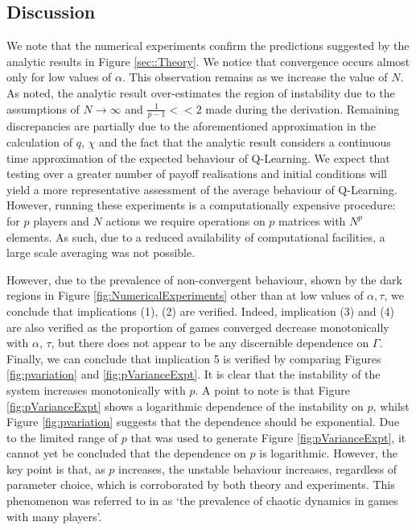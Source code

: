 \documentclass[sigconf,anonymous]{aamas}
\begin{document}
\subsection{Discussion}
    
We note that the numerical experiments confirm the predictions
suggested by the analytic results in Figure
\ref{sec::Theory}. We notice that convergence occurs almost only for
low values of $\alpha$. This observation remains as we increase the
value of $N$. As noted, the analytic result over-estimates the region
of instability due to the assumptions of $N \rightarrow \infty$ and
$\frac{1}{p-1} << 2$ made during the derivation. Remaining
discrepancies are partially due to the aforementioned approximation in
the calculation of $q$, $\chi$ and the fact that the analytic result
considers a continuous time approximation of the expected behaviour of
Q-Learning. We expect that testing over a greater number of payoff
realisations and initial conditions will yield a more representative
assessment of the average behaviour of Q-Learning. However, running
these experiments is a computationally expensive procedure: for $p$
players and $N$ actions we require operations on $p$ matrices with
$N^{p}$ elements. As such, due to a reduced availability of
computational facilities, a large scale averaging was not possible.

However, due to the prevalence of non-convergent behaviour, shown by
the dark regions in Figure \ref{fig:NumericalExperiments} other than
at low values of $\alpha, \tau$, we conclude that implications (1),
(2) are verified. Indeed, implication (3) and (4) are also verified as
the proportion of games converged decrease monotonically with
$\alpha$, $\tau$, but there does not appear to be any discernible
dependence on $\Gamma$. Finally, we can conclude that implication 5 is
verified by comparing Figures \ref{fig:pvariation} and
\ref{fig:pVarianceExpt}. It is clear that the instability of the
system increases monotonically with $p$. A point to note is that
Figure \ref{fig:pVarianceExpt} shows a logarithmic dependence of the
instability on $p$, whilst Figure \ref{fig:pvariation} suggests that
the dependence should be exponential. Due to the limited range of $p$
that was used to generate Figure \ref{fig:pVarianceExpt}, it cannot
yet be concluded that the dependence on $p$ is logarithmic. However,
the key point is that, as $p$ increases, the unstable behaviour
increases, regardless of parameter choice, which is corroborated by
both theory and experiments. This phenomenon was referred to in
\cite{Sanders2018}
as `the prevalence of chaotic dynamics in games with many
players'.
\end{document}
